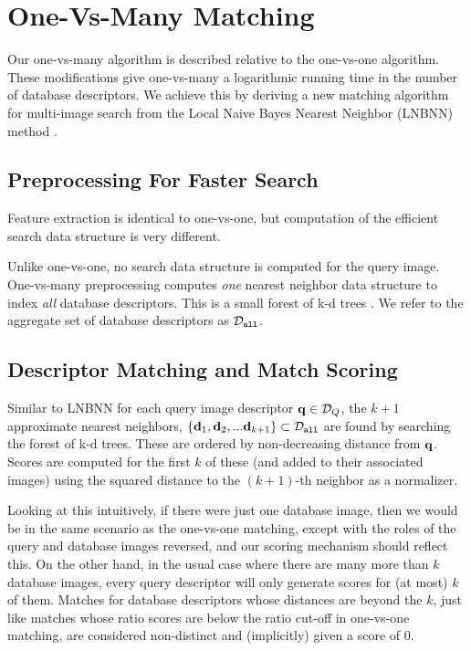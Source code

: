 
\section {One-Vs-Many Matching}

Our one-vs-many algorithm is described relative to the one-vs-one algorithm.
These modifications give one-vs-many a logarithmic running time in the number
of database descriptors. We achieve this by deriving a new matching algorithm
for multi-image search from the Local Naive Bayes Nearest Neighbor (LNBNN) method \cite{cvpr11McCannLNBNN}.

\subsection {Preprocessing For Faster Search}

Feature extraction is identical to one-vs-one, but
computation of the efficient search data structure is very different.

Unlike one-vs-one, no search data structure is computed for the query image.
One-vs-many preprocessing computes \emph{one} nearest neighbor
data structure to index \emph{all} database descriptors.  This is
a small forest of k-d trees \cite{cvpr08HartleyKDTree}.   We refer to the aggregate
set of database descriptors as $\mathcal{D}_{\tt all}$.

\subsection{Descriptor Matching and Match Scoring} \label{sec:match2}

Similar to LNBNN \cite{cvpr11McCannLNBNN} for each query image descriptor $\mathbf{q} \in \mathcal{D}_Q$, the $k+1$
approximate nearest neighbors, $\{ \mathbf{d}_1, \mathbf{d}_2, ... \mathbf{d}_{k+1} \} \subset \mathcal{D}_{\tt all}$ are found by
searching the forest of k-d trees.  These are ordered by non-decreasing distance from $\mathbf{q}$.
Scores are computed for the first $k$ of these (and added to their
associated images) using the squared distance to the $(k+1)$-th neighbor as a normalizer.

Looking at this intuitively, if
there were just one database image, then we would be in the same
scenario as the one-vs-one matching, except with the roles of the
query and database images reversed, and our scoring mechanism should
reflect this.  On the other hand, in the usual
case where there are many more than $k$ database images, every query descriptor will only
generate scores for (at most) $k$ of them.  Matches for database
descriptors whose distances are beyond the $k$, just like matches
whose ratio scores are below the ratio cut-off in one-vs-one
matching, are considered non-distinct and (implicitly) given a score
of 0.

